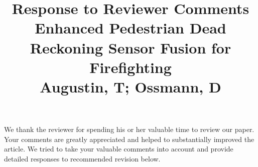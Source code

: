\documentclass{article}
\begin{document}
\title{\textsf{Response to Reviewer Comments} \\ [+2mm] \small Enhanced Pedestrian Dead Reckoning Sensor Fusion for Firefighting
\\ [+2mm]
Augustin, T; Ossmann, D}

\date{}
\maketitle

We  thank the reviewer for spending his or her valuable time to review our paper. Your comments are greatly appreciated and helped to substantially improved the article. We tried to take your valuable comments into account and provide detailed responses to recommended revision below.


\end{document}
